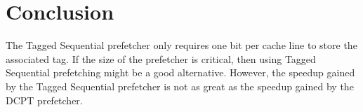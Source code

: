 \section{Conclusion}

The Tagged Sequential prefetcher only requires one bit per cache line to store
the associated tag. If the size of the prefetcher is critical, then using Tagged
Sequential prefetching might be a good alternative. However, the speedup gained
by the Tagged Sequential prefetcher is not as great as the speedup gained by the
DCPT prefetcher.

